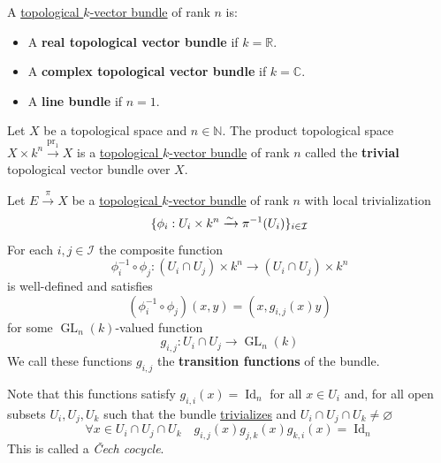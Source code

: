 \documentclass[../../../main]{subfiles}
\begin{document}
\begin{notation}
  A \hyperref[def:topological-vector-bundle]{topological \(k\)-vector bundle} of rank \(n\) is:
  \begin{itemize}
    \item A \textbf{real topological vector bundle} if \(k = \mathbb{R}\).
    \item A \textbf{complex topological vector bundle} if \(k = \mathbb{C}\).
    \item A \textbf{line bundle} if \(n = 1\).
  \end{itemize}
\end{notation}


\begin{example}\label{ex:trivial-topological-vector-bundle}
  Let \(X\) be a topological space and \(n \in \mathbb{N}\).
  The product topological space \(X \times k^{n} \xrightarrow{\operatorname{pr}_{1}} X\) is a \hyperref[def:topological-vector-bundle]{topological \(k\)-vector bundle} of rank \(n\) called the \textbf{trivial} topological vector bundle over \(X\).
\end{example}

\begin{remark}
  Let \(E \xrightarrow{\pi} X\) be a \hyperref[def:topological-vector-bundle]{topological \(k\)-vector bundle} of rank \(n\) with local trivialization
  \begin{equation*}
    \{\phi_{i}: U_{i} \times k^{n} \xrightarrow{\sim} \pi^{-1}(U_{i})\}_{i \in \mathcal{I}}
  \end{equation*}
  For each \(i, j \in \mathcal{I}\) the composite function
  \begin{equation*}
    \phi_{i}^{-1} \circ \phi_{j}: (U_{i} \cap U_{j}) \times k^{n} \to (U_{i} \cap U_{j}) \times k^{n}
  \end{equation*}
  is well-defined and satisfies
  \begin{equation*}
    \left(  \phi_{i}^{-1} \circ \phi_{j} \right)(x, y) = (x, g_{i,j}(x)y)
  \end{equation*}
  for some \(\operatorname{GL}_{n}(k)\)-valued function
  \begin{equation*}
    g_{i,j}: U_{i} \cap U_{j} \to \operatorname{GL}_{n}(k)
  \end{equation*}
  We call these functions \(g_{i, j}\) the \textbf{transition functions} of the bundle.

  Note that this functions satisfy \(g_{i,i}(x) = \operatorname{Id}_{n}\) for all \(x \in U_{i}\) and, for all open subsets \(U_{i}, U_{j}, U_{k}\) such that the bundle \hyperref[def:trivial-vector-bundle]{trivializes} and \(U_{i} \cap U_{j} \cap U_{k} \neq \varnothing\)
  \begin{equation*}
    \forall x \in U_{i} \cap U_{j} \cap U_{k} \quad g_{i,j}(x)g_{j,k}(x)g_{k,i}(x) = \operatorname{Id}_{n}
  \end{equation*}
  This is called a \textit{\v{C}ech cocycle}.
\end{remark}
\end{document}
